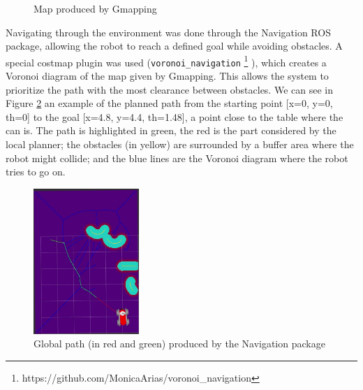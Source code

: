 \documentclass[11pt,a4paper]{article}
\begin{document}
\begin{figure}[ht!]%
	\centering
    \qquad  
    \caption{Map produced by Gmapping}
    \label{fig:gmapping}
\end{figure}

Navigating through the environment was done through the Navigation ROS package, allowing the robot to reach a defined goal while avoiding obstacles. A special costmap plugin was used (\verb!voronoi_navigation! \footnote{https://github.com/MonicaArias/voronoi\_navigation} ), which creates a Voronoi diagram of the map given by Gmapping. This allows the system to prioritize the path with the most clearance between obstacles. We can see in Figure \ref{fig:globalPath} an example of the planned path from the starting point [x=0, y=0,  th=0] to the goal [x=4.8, y=4.4, th=1.48], a point close to the table where the can is. The path is highlighted in green, the red is the part considered by the local planner; the obstacles (in yellow) are surrounded by a buffer area where the robot might collide; and the blue lines are the Voronoi diagram where the robot tries to go on.

\begin{figure}[h!]
	\centering
    \includegraphics[width=4cm]{globalplan.png}
    \caption{Global path (in red and green) produced by the Navigation package}
    \label{fig:globalPath}
\end{figure}
\end{document}
